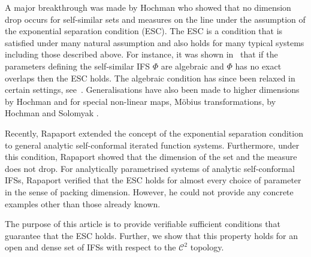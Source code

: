 \documentclass[12pt,]{article}
\theoremstyle{definition}
\theoremstyle{remark}
\newcommand{\0}{\mathbf{0}}
\begin{document}
{A major breakthrough was made by Hochman \cite{Hochman_SelfSimESC_Annals} who showed that no
dimension drop occurs for self-similar sets and measures on the line under the
assumption of the exponential separation condition (ESC).
The ESC is a condition that is satisfied under many natural assumption and also holds for many typical
systems including those described above. 
For instance, it was shown in~\cite{Hochman_SelfSimESC_Annals}
that if the parameters defining the self-similar IFS $\Phi$ are algebraic and $\Phi$ has no exact
overlaps then the ESC holds. The algebraic condition has since been relaxed in certain settings,
see~\cite{FengFeng_DimHomoIFSAlgebraicTrans_arxiv, Rapaport_ExactOverlapsAlgebraicContr,
RapaportVarju_Duke24, Varju_BernConv_Annals19}.
Generalisations have also been made to higher dimensions by Hochman \cite{Hochman2017} and for special non-linear
maps, M\"obius transformations, by Hochman and Solomyak \cite{HochmanSolomyak_Invent17}.


Recently, Rapaport \cite{Rapaport_SelfConfESC25arXiv} extended the concept of the exponential
separation condition to general
analytic self-conformal iterated function systems. Furthermore, under this condition, Rapaport
showed that the dimension of the set and the measure does not drop.
For analytically parametrised systems of analytic self-conformal IFSs, Rapaport verified that the
ESC holds for almost every choice of parameter in the sense of packing dimension.
However, he could not provide any concrete examples other than those already known.

The purpose of this article is to provide verifiable sufficient conditions that guarantee that the
ESC holds. Further, we show that this property holds for an open and dense set of IFSs with respect to the
$\mathcal{C}^2$ topology.

}
\end{document}
